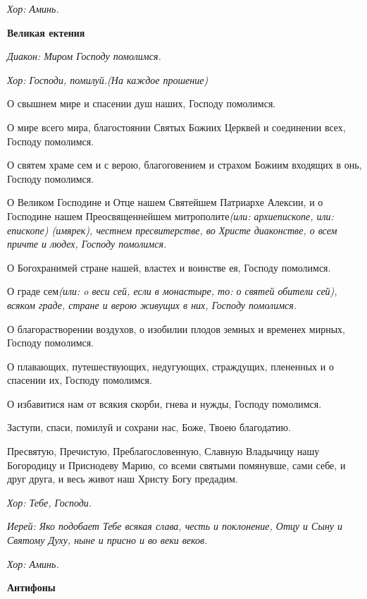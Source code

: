 \itshape Хор:\normalfont{} Аминь.


\medskip\bfseries Великая ектения\normalfont{}\nopagebreak


\itshape Диакон:\normalfont{} Миром Господу помолимся. 


\itshape Хор:\normalfont{} Господи, помилуй.\itshape  (На каждое прошение)\normalfont{}


О свышнем мире и спасении душ наших, Господу помолимся. 


О мире всего мира, благостоянии Святых Божиих Церквей и соединении всех, Господу помолимся.


О святем храме сем и с верою, благоговением и страхом Божиим входящих в онь, Господу помолимся. 


О Великом Господине и Отце нашем Святейшем Патриархе Алексии, и о Господине нашем Преосвященнейшем митрополите\itshape  (или:\normalfont{} архиепископе\itshape , или:\normalfont{} епископе\itshape ) (имярек)\normalfont{}, честнем пресвитерстве, во Христе диаконстве, о всем причте и людех, Господу помолимся. 


О Богохранимей стране нашей, властех и воинстве ея, Господу помолимся.


О граде сем\itshape  (или:\normalfont{} o веси сей\itshape , если в монастыре, то: о\normalfont{} святей обители сей), всяком граде, стране и верою живущих в них, Господу помолимся. 


О благорастворении воздухов, о изобилии плодов земных и временех мирных, Господу помолимся.


О плавающих, путешествующих, недугующих, страждущих, плененных и о спасении их, Господу помолимся. 


О избавитися нам от всякия скорби, гнева и нужды, Господу помолимся. 


Заступи, спаси, помилуй и сохрани нас, Боже, Твоею благодатию. 


Пресвятую, Пречистую, Преблагословенную, Славную Владычицу нашу Богородицу и Приснодеву Марию, со всеми святыми помянувше, сами себе, и друг друга, и весь живот наш Христу Богу предадим. 


\itshape Хор:\normalfont{} Тебе, Господи. 


\itshape Иерей:\normalfont{} Яко подобает Тебе всякая слава, честь и поклонение, Отцу и Сыну и Святому Духу, ныне и присно и во веки веков. 


\itshape Хор:\normalfont{} Аминь.


\medskip\bfseries Антифоны\normalfont{}\nopagebreak


